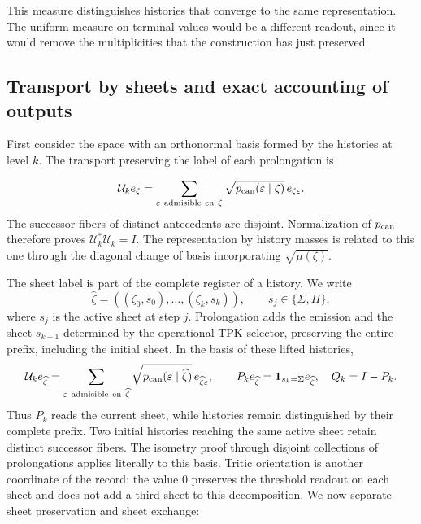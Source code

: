This measure distinguishes histories that converge to the same representation. The uniform measure on terminal values would be a different readout, since it would remove the multiplicities that the construction has just preserved.



\subsection{Transport by sheets and exact accounting of outputs}
First consider the space with an orthonormal basis formed by the histories at level \(k\). The transport preserving the label of each prolongation is

\[
\mathcal U_ke_\zeta=
\sum_{\varepsilon\ \mathrm{admisible\ en}\ \zeta}
\sqrt{p_{\rm can}(\varepsilon\mid\zeta)}\,e_{\zeta\varepsilon}.
\]
The successor fibers of distinct antecedents are disjoint. Normalization of \(p_{\rm can}\) therefore proves \(\mathcal U_k^*\mathcal U_k=I\). The representation by history masses is related to this one through the diagonal change of basis incorporating \(\sqrt{\mu(\zeta)}\).

The sheet label is part of the complete register of a history. We write
\[
\widehat\zeta=((\zeta_0,s_0),\ldots,(\zeta_k,s_k)),\qquad
s_j\in\{\Sigma,\Pi\},
\]
where \(s_j\) is the active sheet at step \(j\). Prolongation adds the emission and the sheet \(s_{k+1}\) determined by the operational TPK selector, preserving the entire prefix, including the initial sheet. In the basis of these lifted histories,
\[
\mathcal U_ke_{\widehat\zeta}
=\sum_{\varepsilon\ \mathrm{admisible\ en}\ \widehat\zeta}
\sqrt{p_{\rm can}(\varepsilon\mid\widehat\zeta)}\,e_{\widehat\zeta\varepsilon},
\qquad
P_ke_{\widehat\zeta}=\mathbf1_{s_k=\Sigma}e_{\widehat\zeta},\quad
Q_k=I-P_k.
\]
Thus \(P_k\) reads the current sheet, while histories remain distinguished by their complete prefix. Two initial histories reaching the same active sheet retain distinct successor fibers. The isometry proof through disjoint collections of prolongations applies literally to this basis.
Tritic orientation is another coordinate of the record: the value \(0\) preserves the threshold readout on each sheet and does not add a third sheet to this decomposition. We now separate sheet preservation and sheet exchange:

